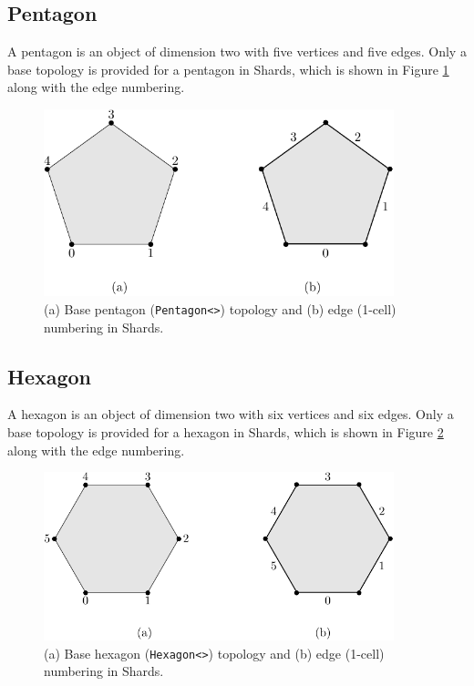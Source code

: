 \documentclass[pdf,12pt,relaxed]{SANDreport}
\begin{document}
\subsection{Pentagon}
 
A pentagon is an object of dimension two with five vertices and five edges. Only a base topology is provided for a pentagon in Shards, which is shown in Figure \ref{fig:pent} along with the edge numbering.
\begin{figure}[ht]
 \begin{center}
    \includegraphics[width=4.0in]{topo_figs/pentagon.pdf}
  \end{center}
  \caption{ (a) Base pentagon ({\tt Pentagon<>}) topology and (b) edge (1-cell) numbering in Shards.}
 \label{fig:pent}
 \end{figure}
   
\subsection{Hexagon}
A hexagon is an object of dimension two with six vertices and six edges. Only a base topology is provided for a hexagon in Shards, which is shown in Figure \ref{fig:hex} along with the edge numbering.
\begin{figure}[ht]
  \begin{center}
    \includegraphics[width=4.0in]{topo_figs/hexagon.pdf}
  \end{center}
 \begin{center} 
   \caption{ (a) Base hexagon ({\tt Hexagon<>}) topology and (b) edge (1-cell) numbering in Shards.}
 \end{center}
\label{fig:hex}
\end{figure}
\end{document}
